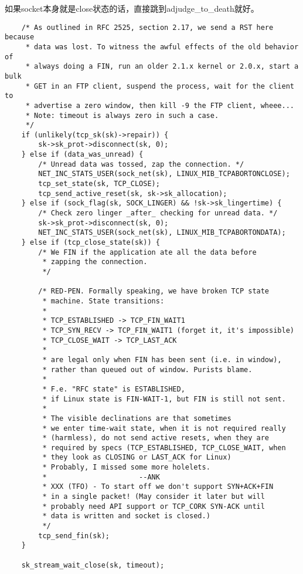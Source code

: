 		如果socket本身就是close状态的话，直接跳到adjudge\_to\_death就好。

\begin{verbatim}
	/* As outlined in RFC 2525, section 2.17, we send a RST here because
	 * data was lost. To witness the awful effects of the old behavior of
	 * always doing a FIN, run an older 2.1.x kernel or 2.0.x, start a bulk
	 * GET in an FTP client, suspend the process, wait for the client to
	 * advertise a zero window, then kill -9 the FTP client, wheee...
	 * Note: timeout is always zero in such a case.
	 */
	if (unlikely(tcp_sk(sk)->repair)) {
		sk->sk_prot->disconnect(sk, 0);
	} else if (data_was_unread) {
		/* Unread data was tossed, zap the connection. */
		NET_INC_STATS_USER(sock_net(sk), LINUX_MIB_TCPABORTONCLOSE);
		tcp_set_state(sk, TCP_CLOSE);
		tcp_send_active_reset(sk, sk->sk_allocation);
	} else if (sock_flag(sk, SOCK_LINGER) && !sk->sk_lingertime) {
		/* Check zero linger _after_ checking for unread data. */
		sk->sk_prot->disconnect(sk, 0);
		NET_INC_STATS_USER(sock_net(sk), LINUX_MIB_TCPABORTONDATA);
	} else if (tcp_close_state(sk)) {
		/* We FIN if the application ate all the data before
		 * zapping the connection.
		 */

		/* RED-PEN. Formally speaking, we have broken TCP state
		 * machine. State transitions:
		 *
		 * TCP_ESTABLISHED -> TCP_FIN_WAIT1
		 * TCP_SYN_RECV	-> TCP_FIN_WAIT1 (forget it, it's impossible)
		 * TCP_CLOSE_WAIT -> TCP_LAST_ACK
		 *
		 * are legal only when FIN has been sent (i.e. in window),
		 * rather than queued out of window. Purists blame.
		 *
		 * F.e. "RFC state" is ESTABLISHED,
		 * if Linux state is FIN-WAIT-1, but FIN is still not sent.
		 *
		 * The visible declinations are that sometimes
		 * we enter time-wait state, when it is not required really
		 * (harmless), do not send active resets, when they are
		 * required by specs (TCP_ESTABLISHED, TCP_CLOSE_WAIT, when
		 * they look as CLOSING or LAST_ACK for Linux)
		 * Probably, I missed some more holelets.
		 * 						--ANK
		 * XXX (TFO) - To start off we don't support SYN+ACK+FIN
		 * in a single packet! (May consider it later but will
		 * probably need API support or TCP_CORK SYN-ACK until
		 * data is written and socket is closed.)
		 */
		tcp_send_fin(sk);
	}

	sk_stream_wait_close(sk, timeout);
\end{verbatim}

